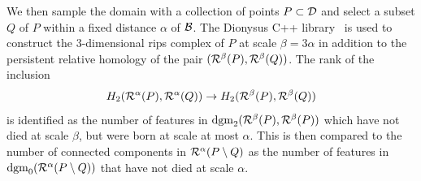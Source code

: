 We then sample the domain with a collection of points $P\subset{\mathcal{D}}$ and select a subset $Q$ of $P$ within a fixed distance $\alpha$ of ${\mathcal{B}}$.
The Dionysus C++ library~\cite{dionysus2} is used to construct the 3-dimensional rips complex of $P$ at scale $\beta = 3\alpha$ in addition to the persistent relative homology of the pair $(\mathcal{R}^\beta(P), \mathcal{R}^\beta(Q))$.
The rank of the inclusion \[H_2(\mathcal{R}^\alpha(P), \mathcal{R}^\alpha(Q))\to H_2(\mathcal{R}^\beta(P), \mathcal{R}^\beta(Q))\] is identified as the number of features in $\mathrm{dgm}_2(\mathcal{R}^\beta(P), \mathcal{R}^\beta(P))$ which have not died at scale $\beta$, but were born at scale at most $\alpha$.
This is then compared to the number of connected components in $\mathcal{R}^\alpha(P\setminus Q)$ as the number of features in $\mathrm{dgm}_0(\mathcal{R}^\alpha(P\setminus Q))$ that have not died at scale $\alpha$.

%


